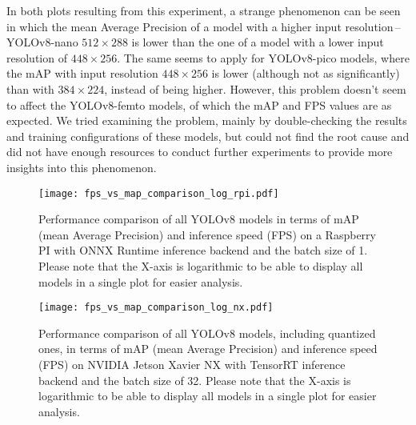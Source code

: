 In both plots resulting from this experiment, a strange phenomenon can be seen
in which the mean Average Precision of a model with a higher input
resolution\,--\,YOLOv8-nano $512 \times 288$ is lower than the one of a model
with a lower input resolution of $448 \times 256$. The same seems to apply for
YOLOv8-pico models, where the mAP with input resolution $448 \times 256$ is
lower (although not as significantly) than with $384 \times 224$, instead of
being higher. However, this problem doesn't seem to affect the YOLOv8-femto
models, of which the mAP and FPS values are as expected. We tried examining the
problem, mainly by double-checking the results and training configurations of
these models, but could not find the root cause and did not have enough
resources to conduct further experiments to provide more insights into this
phenomenon.








\begin{figure}[H]
    \begin{framed}
        \centering
        \texttt{[image: fps\_vs\_map\_comparison\_log\_rpi.pdf]}
        \caption{Performance comparison of all YOLOv8 models in terms of mAP
        (mean Average Precision) and inference speed (FPS) on a Raspberry PI
        with ONNX Runtime inference backend and the batch size of 1. Please note
        that the X-axis is logarithmic to be able to display all models in a
        single plot for easier analysis.}
        \label{FPSvsmAPComparisonRPI}
    \end{framed}
\end{figure}

\begin{figure}[H]
    \begin{framed}
        \centering
        \texttt{[image: fps\_vs\_map\_comparison\_log\_nx.pdf]}
        \caption{Performance comparison of all YOLOv8 models, including
        quantized ones, in terms of mAP (mean Average Precision) and inference
        speed (FPS) on NVIDIA Jetson Xavier NX with TensorRT inference backend
        and the batch size of 32. Please note that the X-axis is logarithmic to
        be able to display all models in a single plot for easier analysis.}
        \label{FPSvsmAPComparisonNX}
    \end{framed}
\end{figure}








